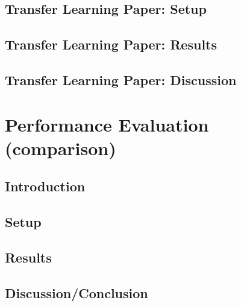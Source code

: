 \subsection{Transfer Learning Paper: Setup}
\subsection{Transfer Learning Paper: Results}
\subsection{Transfer Learning Paper: Discussion}
\section{Performance Evaluation (comparison)}
\subsection{Introduction}
\subsection{Setup}
\subsection{Results}
\subsection{Discussion/Conclusion}